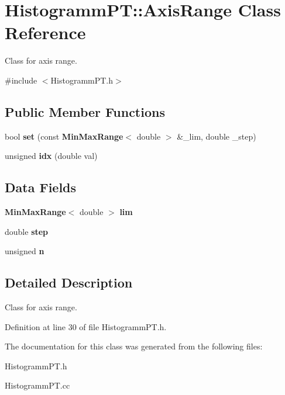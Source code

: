 \section{HistogrammPT::AxisRange Class Reference}
\label{classHistogrammPT_1_1AxisRange}


Class for axis range.  


{\ttfamily \#include $<$HistogrammPT.h$>$}\subsection*{Public Member Functions}
\begin{DoxyCompactItemize}
\item 
bool {\bfseries set} (const {\bf MinMaxRange}$<$ double $>$ \&\_\-lim, double \_\-step)\label{classHistogrammPT_1_1AxisRange_a2502c6bc3acea4407d8c40f98b8ebbbc}

\item 
unsigned {\bfseries idx} (double val)\label{classHistogrammPT_1_1AxisRange_a9704c7046100d7dde3f6d68e201142f2}

\end{DoxyCompactItemize}
\subsection*{Data Fields}
\begin{DoxyCompactItemize}
\item 
{\bf MinMaxRange}$<$ double $>$ {\bfseries lim}\label{classHistogrammPT_1_1AxisRange_af69eb3b0a5c1444e10943256c2c44484}

\item 
double {\bfseries step}\label{classHistogrammPT_1_1AxisRange_a5ce62b557ca23603c32cc5ad5b5bc52e}

\item 
unsigned {\bfseries n}\label{classHistogrammPT_1_1AxisRange_a145ae4ea2354e5ff0881a69672c23e2a}

\end{DoxyCompactItemize}


\subsection{Detailed Description}
Class for axis range. 

Definition at line 30 of file HistogrammPT.h.

The documentation for this class was generated from the following files:\begin{DoxyCompactItemize}
\item 
HistogrammPT.h\item 
HistogrammPT.cc\end{DoxyCompactItemize}
